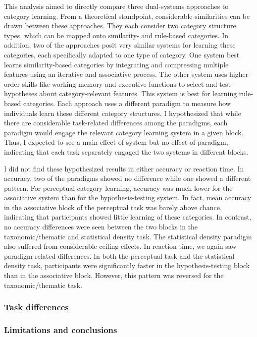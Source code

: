 \documentclass[../dissertation.tex]{subfiles}
\begin{document}
This analysis aimed to directly compare three dual-systems approaches to category learning. From a theoretical standpoint, considerable similarities can be drawn between these approaches. They each consider two category structure types, which can be mapped onto similarity- and rule-based categories. In addition, two of the approaches posit very similar systems for learning these categories, each specifically adapted to one type of category. One system best learns similarity-based categories by integrating and compressing multiple features using an iterative and associative process. The other system uses higher-order skills like working memory and executive functions to select and test hypotheses about category-relevant features. This system is best for learning rule-based categories. Each approach uses a different paradigm to measure how individuals learn these different category structures. I hypothesized that while there are considerable task-related differences among the paradigms, each paradigm would engage the relevant category learning system in a given block. Thus, I expected to see a main effect of system but no effect of paradigm, indicating that each task separately engaged the two systems in different blocks. \par
	I did not find these hypothesized results in either accuracy or reaction time. In accuracy, two of the paradigms showed no difference while one showed a different pattern. For perceptual category learning, accuracy was much lower for the associative system than for the hypothesis-testing system. In fact, mean accuracy in the associative block of the perceptual task was barely above chance, indicating that participants showed little learning of these categories. In contrast, no accuracy differences were seen between the two blocks in the taxonomic/thematic and statistical density task. The statistical density paradigm also suffered from considerable ceiling effects. In reaction time, we again saw paradigm-related differences. In both the perceptual task and the statistical density task, participants were significantly faster in the hypothesis-testing block than in the associative block. However, this pattern was reversed for the taxonomic/thematic task. \par
	
\subsubsection{Task differences}

	
\subsubsection{Limitations and conclusions}
\end{document}
